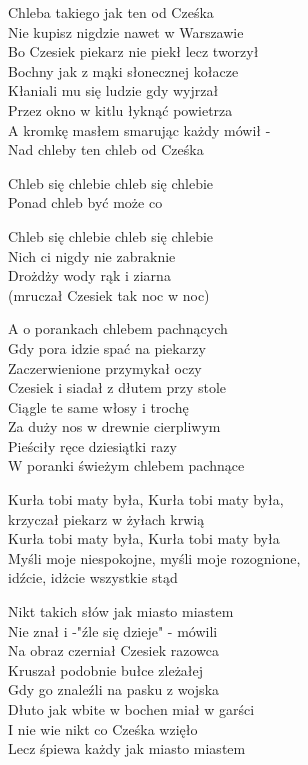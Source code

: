 
\begin{text}
    Chleba takiego jak ten od Cześka\\
    Nie kupisz nigdzie nawet w Warszawie\\
    Bo Czesiek piekarz nie piekł lecz tworzył\\
    Bochny jak z mąki słonecznej kołacze\\
    Kłaniali mu się ludzie gdy wyjrzał\\
    Przez okno w kitlu łyknąć powietrza\\
    A kromkę masłem smarując każdy mówił -\\
    Nad chleby ten chleb od Cześka

    \vin Chleb się chlebie chleb się chlebie\\
    \vin Ponad chleb być może co

    Chleb się chlebie chleb się chlebie\\
    Nich ci nigdy nie zabraknie\\
    Drożdży wody rąk i ziarna\\
    (mruczał Czesiek tak noc w noc)

    A o porankach chlebem pachnących\\
    Gdy pora idzie spać na piekarzy\\
    Zaczerwienione przymykał oczy\\
    Czesiek i siadał z dłutem przy stole\\
    Ciągle te same włosy i trochę\\
    Za duży nos w drewnie cierpliwym\\
    Pieściły ręce dziesiątki razy\\
    W poranki świeżym chlebem pachnące

    Kurła tobi maty była, Kurła tobi maty była,\\
    krzyczał piekarz w żyłach krwią\\
    Kurła tobi maty była, Kurła tobi maty była\\
    Myśli moje niespokojne, myśli moje rozognione,\\
    idźcie, idżcie wszystkie stąd

    Nikt takich słów jak miasto miastem\\
    Nie znał i -"źle się dzieje" - mówili\\
    Na obraz czerniał Czesiek razowca\\
    Kruszał podobnie bułce zleżałej\\
    Gdy go znaleźli na pasku z wojska\\
    Dłuto jak wbite w bochen miał w garści\\
    I nie wie nikt co Cześka wzięło\\
    Lecz śpiewa każdy jak miasto miastem
\end{text}
\begin{chord}

\end{chord}